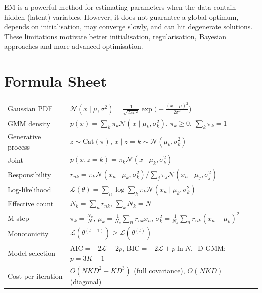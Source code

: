 \documentclass[11pt,a4paper]{article}
\newcommand{\N}{\mathcal{N}}
\newcommand{\LL}{\mathcal{L}}
\begin{document}
\begin{keyidea}
EM is a powerful method for estimating parameters when the data contain hidden (latent) variables. However, it does not guarantee a global optimum, depends on initialisation, may converge slowly, and can hit degenerate solutions. These limitations motivate better initialisation, regularisation, Bayesian approaches and more advanced optimisation.
\end{keyidea}

\section{Formula Sheet}

\begin{center}
\renewcommand{\arraystretch}{1.5}
\begin{tabular}{@{}ll@{}}
\toprule
Gaussian PDF & $\N(x\mid\mu,\sigma^2)=\frac{1}{\sqrt{2\pi\sigma^2}}\exp\!\big(-\frac{(x-\mu)^2}{2\sigma^2}\big)$\\
GMM density & $p(x)=\sum_k\pi_k\N(x\mid\mu_k,\sigma_k^2)$, \quad $\pi_k\ge0$, $\sum_k\pi_k=1$\\
Generative process & $z\sim\mathrm{Cat}(\pi)$, \quad $x\mid z=k\sim\N(\mu_k,\sigma_k^2)$\\
Joint & $p(x,z=k)=\pi_k\N(x\mid\mu_k,\sigma_k^2)$\\
Responsibility & $r_{nk}=\pi_k\N(x_n\mid\mu_k,\sigma_k^2)\big/\sum_j\pi_j\N(x_n\mid\mu_j,\sigma_j^2)$\\
Log-likelihood & $\LL(\theta)=\sum_n\log\sum_k\pi_k\N(x_n\mid\mu_k,\sigma_k^2)$\\
Effective count & $N_k=\sum_nr_{nk}$, \quad $\sum_kN_k=N$\\
M-step & $\pi_k=\frac{N_k}{N}$, \quad $\mu_k=\frac{1}{N_k}\sum_nr_{nk}x_n$, \quad $\sigma_k^2=\frac{1}{N_k}\sum_nr_{nk}(x_n-\mu_k)^2$\\
Monotonicity & $\LL(\theta^{(t+1)})\ge\LL(\theta^{(t)})$\\
Model selection & $\mathrm{AIC}=-2\LL+2p$, \quad $\mathrm{BIC}=-2\LL+p\ln N$, \quad 1-D GMM: $p=3K-1$\\
Cost per iteration & $O(NKD^2+KD^3)$ (full covariance), \quad $O(NKD)$ (diagonal)\\
\bottomrule
\end{tabular}
\end{center}
\end{document}
